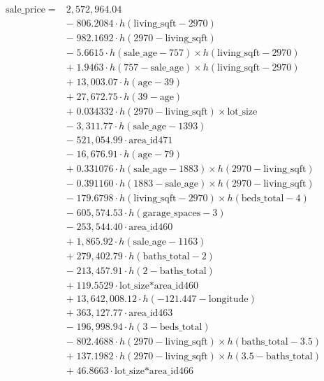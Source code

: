 \documentclass[
]{article}
\begin{document}
\[
 \begin{array}{rl}
\text{sale_price} \;=\; & 2,572,964.04 \\
& - \; 806.2084 \cdot h(\text{living_sqft} - 2970) \\
& - \; 982.1692 \cdot h(2970 - \text{living_sqft}) \\
& - \; 5.6615 \cdot h(\text{sale_age} - 757) \times h(\text{living_sqft} - 2970) \\
& + \; 1.9463 \cdot h(757 - \text{sale_age}) \times h(\text{living_sqft} - 2970) \\
& + \; 13,003.07 \cdot h(\text{age} - 39) \\
& + \; 27,672.75 \cdot h(39 - \text{age}) \\
& + \; 0.034332 \cdot h(2970 - \text{living_sqft}) \times \text{lot_size} \\
& - \; 3,311.77 \cdot h(\text{sale_age} - 1393) \\
& - \; 521,054.99 \cdot \text{area_id471} \\
& - \; 16,676.91 \cdot h(\text{age} - 79) \\
& + \; 0.331076 \cdot h(\text{sale_age} - 1883) \times h(2970 - \text{living_sqft}) \\
& - \; 0.391160 \cdot h(1883 - \text{sale_age}) \times h(2970 - \text{living_sqft}) \\
& - \; 179.6798 \cdot h(\text{living_sqft} - 2970) \times h(\text{beds_total} - 4) \\
& - \; 605,574.53 \cdot h(\text{garage_spaces} - 3) \\
& - \; 253,544.40 \cdot \text{area_id460} \\
& + \; 1,865.92 \cdot h(\text{sale_age} - 1163) \\
& + \; 279,402.79 \cdot h(\text{baths_total} - 2) \\
& - \; 213,457.91 \cdot h(2 - \text{baths_total}) \\
& + \; 119.5529 \cdot \text{lot_size*area_id460} \\
& + \; 13,642,008.12 \cdot h(-121.447 - \text{longitude}) \\
& + \; 363,127.77 \cdot \text{area_id463} \\
& - \; 196,998.94 \cdot h(3 - \text{beds_total}) \\
& - \; 802.4688 \cdot h(2970 - \text{living_sqft}) \times h(\text{baths_total} - 3.5) \\
& + \; 137.1982 \cdot h(2970 - \text{living_sqft}) \times h(3.5 - \text{baths_total}) \\
& + \; 46.8663 \cdot \text{lot_size*area_id466} \\

\end{array}\]
\end{document}
